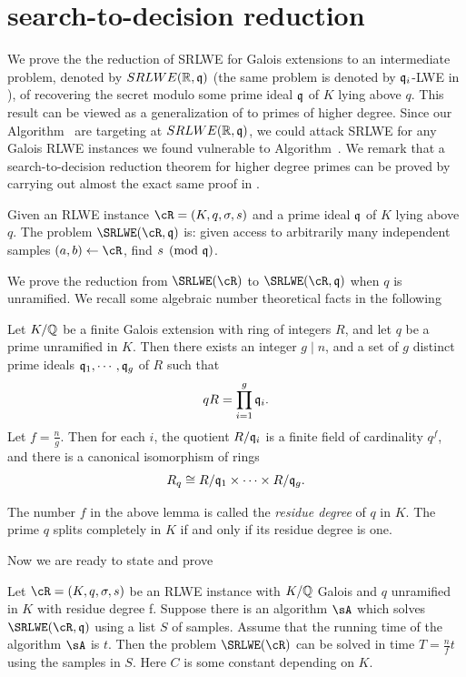 \documentclass{amsart}
\begin{document}
\section{search-to-decision reduction}
\label{sec: s-to-d}

We prove the the reduction of SRLWE for Galois extensions to an intermediate problem, denoted by $SRLWE(\mathbb{R},\mathfrak{q})$ (the same problem is denoted by $\mathfrak{q}_i$-LWE in \cite{lyubashevsky2013ideal}), of recovering the secret modulo some prime ideal $\mathfrak{q}$ of $K $ lying above $q$. This result can be viewed as a generalization of \cite[Theorem 2]{eisentrager2014weak} to primes of higher degree. Since our Algorithm~ are targeting at $SRLWE(\mathbb{R},\mathfrak{q})$, we could attack SRLWE for any Galois RLWE instances we found vulnerable to Algorithm~. We remark that a search-to-decision reduction theorem for higher degree primes can be proved by carrying out almost the exact same proof in \cite{eisentrager2014weak}.

\begin{Definition} \label{def: srlwe mod q}
Given an RLWE instance $\cR = (K,q,\sigma, s)$ and a prime ideal $\mathfrak{q}$ of $K$ lying above $q$. The problem $\SRLWE(\cR, \fq)$ is: given access to arbitrarily many independent samples $(a,b) \gets \cR$, find $s \pmod {\mathfrak{q}}$.
\end{Definition}

We prove the reduction from $\SRLWE(\cR)$ to $\SRLWE(\cR,\fq)$ when
$q$ is unramified. We recall some algebraic number theoretical facts in the following
\begin{Lemma}
\label{lem: prime factorization}
Let $K/\mathbb{Q}$ be a finite Galois extension with ring of integers $R$,  and let $q$ be a prime unramified in $K$. Then there exists an integer $g \mid n$, and a set of $g$ distinct prime ideals $\mathfrak{q}_1, \cdots ,\mathfrak{q}_g$ of
$R$ such that
\[
    qR = \prod_{i=1}^g \mathfrak{q}_i.
\]
Let $f = \frac{n}{g}$. Then for each $i$, the quotient $R/\mathfrak{q}_{i}$ is a finite field of cardinality $q^f$, and there is a canonical isomorphism of rings
\[
    R_q \cong R/\mathfrak{q}_{1} \times \cdots \times R/\mathfrak{q}_{g}.
\]
\end{Lemma}
The number $f$ in the above lemma is called the {\it residue degree} of $q$ in $K$. The prime $q$ splits completely in $K$ if and only if its residue degree is one.

Now we are ready to state and prove
\begin{theorem} \label{thm: reduction}
Let $\cR = (K,q,\sigma, s)$ be an RLWE instance with $K/\mathbb{Q}$ Galois and $q$ unramified in $K$ with residue degree f. Suppose there is an algorithm $\sA$ which solves $\SRLWE(\cR,\fq)$ using a list $S$ of samples. Assume that the running time of the algorithm $\sA$ is $t$. Then the problem $\SRLWE(\cR)$ can be solved in time $T = \frac{n}{f}t$ using the samples in $S$. Here $C$ is some constant depending on $K$.
\end{theorem}
\end{document}

